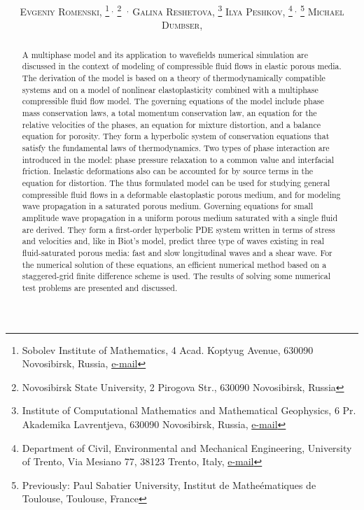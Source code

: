 \documentclass[3p,times,table]{article}
\title{\vspace{-15mm}\fontsize{14pt}{10pt}\bf\selectfont{
Modeling wavefields in saturated elastic porous medium\\[1mm] based on 
thermodynamically 
compatible 
system theory for\\[1mm] multiphase mixtures}}
\author{\fontsize{10pt}{10pt}
	\textsc{Evgeniy Romenski},\hspace{-2mm}
	\thanks{Sobolev Institute of Mathematics, 4 Acad. Koptyug Avenue, 630090 
	Novosibirsk, 
	Russia, \href{mailto:evrom@math.nsc.ru}{e-mail}
		   }$\ ^, $
   \hspace{-3mm}
   \thanks{Novosibirsk State University, 2 Pirogova Str., 630090 Novosibirsk, Russia}
	\hspace{-1.5mm}$\ ^,$\samethanks[4]
\quad 
%
	\textsc{Galina Reshetova},\hspace{-2mm}
	\thanks{Institute of Computational Mathematics and Mathematical Geophysics, 6 Pr. 
	Akademika Lavrentjeva, 630090 Novosibirsk, Russia, 	\href{mailto:kgv@nmsf.sscc.ru}{e-mail}
		   }
\quad
	\textsc{Ilya Peshkov},\hspace{-2mm}
	\thanks{Department of Civil, Environmental and Mechanical Engineering, 
	University of Trento, Via Mesiano 77, 38123 Trento, Italy,
	\href{mailto:ilya.peshkov@unitn.it}{e-mail}
		   }$\ ^, $
	   \hspace{-2.5mm}
	   	\thanks{Previously: Paul Sabatier University, Institut de 
	   	Mathe\'ematiques 
	   	de Toulouse, Toulouse, France}
\quad
	\textsc{Michael Dumbser},\hspace{-2mm}
	\samethanks[4]
	   }
\begin{document}
 
\maketitle

\begin{abstract} 
\noindent
A multiphase model and its application to  wavefields numerical simulation 
are discussed in the context of modeling of compressible fluid flows in elastic 
porous media. The derivation of the model is based 
on  a theory of 
thermodynamically compatible systems and on  a model of nonlinear 
elastoplasticity combined with a multiphase compressible fluid flow model. The 
governing equations of the model include  phase mass conservation laws, a
total momentum conservation law, an equation for the relative velocities of the phases, an 
equation for mixture distortion, and a balance equation for 
porosity. They form a hyperbolic system of conservation equations that 
satisfy the fundamental laws of thermodynamics. Two types of phase interaction are 
introduced in the model: phase pressure relaxation to a common value and 
interfacial friction. Inelastic deformations also can be accounted for by  
source terms in the equation for distortion. The thus formulated model 
can be used for studying general compressible fluid flows in a deformable 
elastoplastic 
porous medium, and for modeling wave propagation in a saturated 
porous medium. 
Governing equations for small amplitude wave propagation in a uniform 
porous medium saturated 
with a single fluid are derived. They form a first-order hyperbolic PDE system 
written in 
terms of stress and velocities and, like in Biot's model, predict three type of 
waves existing in real fluid-saturated porous media: fast and 
slow longitudinal waves and a shear wave. For the 
numerical solution of these equations, an efficient numerical method based on a
staggered-grid finite 
difference scheme is used. The results of solving some numerical test problems are presented and discussed.

\end{abstract}

%
\end{document}

